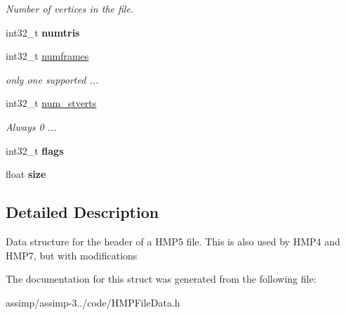 \begin{DoxyCompactItemize}
\begin{DoxyCompactList}\small\item\em Number of vertices in the file. \end{DoxyCompactList}\item 
\hypertarget{struct_assimp_1_1_h_m_p_1_1_header___h_m_p5_ac4e7343b645e6b50756908f9e5be436d}{int32\+\_\+t {\bfseries numtris}}\label{struct_assimp_1_1_h_m_p_1_1_header___h_m_p5_ac4e7343b645e6b50756908f9e5be436d}

\item 
\hypertarget{struct_assimp_1_1_h_m_p_1_1_header___h_m_p5_a6698e1e556752994238553974226fcbe}{int32\+\_\+t \hyperlink{struct_assimp_1_1_h_m_p_1_1_header___h_m_p5_a6698e1e556752994238553974226fcbe}{numframes}}\label{struct_assimp_1_1_h_m_p_1_1_header___h_m_p5_a6698e1e556752994238553974226fcbe}

\begin{DoxyCompactList}\small\item\em only one supported ... \end{DoxyCompactList}\item 
\hypertarget{struct_assimp_1_1_h_m_p_1_1_header___h_m_p5_a05beb18c39987f2560bd190507514c61}{int32\+\_\+t \hyperlink{struct_assimp_1_1_h_m_p_1_1_header___h_m_p5_a05beb18c39987f2560bd190507514c61}{num\+\_\+stverts}}\label{struct_assimp_1_1_h_m_p_1_1_header___h_m_p5_a05beb18c39987f2560bd190507514c61}

\begin{DoxyCompactList}\small\item\em Always 0 ... \end{DoxyCompactList}\item 
\hypertarget{struct_assimp_1_1_h_m_p_1_1_header___h_m_p5_a548a2d755cdc22c40a901f79eb15327b}{int32\+\_\+t {\bfseries flags}}\label{struct_assimp_1_1_h_m_p_1_1_header___h_m_p5_a548a2d755cdc22c40a901f79eb15327b}

\item 
\hypertarget{struct_assimp_1_1_h_m_p_1_1_header___h_m_p5_af6d644b35401d1421557cc5b45c6bf0f}{float {\bfseries size}}\label{struct_assimp_1_1_h_m_p_1_1_header___h_m_p5_af6d644b35401d1421557cc5b45c6bf0f}

\end{DoxyCompactItemize}


\subsection{Detailed Description}
Data structure for the header of a H\+M\+P5 file. This is also used by H\+M\+P4 and H\+M\+P7, but with modifications 

The documentation for this struct was generated from the following file\+:\begin{DoxyCompactItemize}
\item 
assimp/assimp-\/3../code/H\+M\+P\+File\+Data.\+h\end{DoxyCompactItemize}
